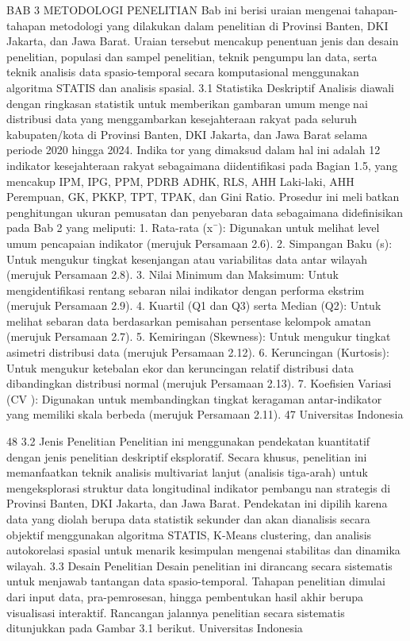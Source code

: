 BAB 3
METODOLOGI PENELITIAN
Bab ini berisi uraian mengenai tahapan-tahapan metodologi yang dilakukan dalam
penelitian di Provinsi Banten, DKI Jakarta, dan Jawa Barat. Uraian tersebut mencakup
penentuan jenis dan desain penelitian, populasi dan sampel penelitian, teknik pengumpulan data, serta teknik analisis data spasio-temporal secara komputasional menggunakan
algoritma STATIS dan analisis spasial.
3.1 Statistika Deskriptif
Analisis diawali dengan ringkasan statistik untuk memberikan gambaran umum mengenai distribusi data yang menggambarkan kesejahteraan rakyat pada seluruh kabupaten/kota
di Provinsi Banten, DKI Jakarta, dan Jawa Barat selama periode 2020 hingga 2024. Indikator yang dimaksud dalam hal ini adalah 12 indikator kesejahteraan rakyat sebagaimana
diidentifikasi pada Bagian 1.5, yang mencakup IPM, IPG, PPM, PDRB ADHK, RLS, AHH
Laki-laki, AHH Perempuan, GK, PKKP, TPT, TPAK, dan Gini Ratio. Prosedur ini melibatkan penghitungan ukuran pemusatan dan penyebaran data sebagaimana didefinisikan
pada Bab 2 yang meliputi:
1. Rata-rata (x¯): Digunakan untuk melihat level umum pencapaian indikator (merujuk
Persamaan 2.6).
2. Simpangan Baku (s): Untuk mengukur tingkat kesenjangan atau variabilitas data
antar wilayah (merujuk Persamaan 2.8).
3. Nilai Minimum dan Maksimum: Untuk mengidentifikasi rentang sebaran nilai
indikator dengan performa ekstrim (merujuk Persamaan 2.9).
4. Kuartil (Q1 dan Q3) serta Median (Q2): Untuk melihat sebaran data berdasarkan
pemisahan persentase kelompok amatan (merujuk Persamaan 2.7).
5. Kemiringan (Skewness): Untuk mengukur tingkat asimetri distribusi data (merujuk
Persamaan 2.12).
6. Keruncingan (Kurtosis): Untuk mengukur ketebalan ekor dan keruncingan relatif
distribusi data dibandingkan distribusi normal (merujuk Persamaan 2.13).
7. Koefisien Variasi (CV ): Digunakan untuk membandingkan tingkat keragaman
antar-indikator yang memiliki skala berbeda (merujuk Persamaan 2.11).
47 Universitas Indonesia

48
3.2 Jenis Penelitian
Penelitian ini menggunakan pendekatan kuantitatif dengan jenis penelitian deskriptifeksploratif. Secara khusus, penelitian ini memanfaatkan teknik analisis multivariat lanjut
(analisis tiga-arah) untuk mengeksplorasi struktur data longitudinal indikator pembangunan strategis di Provinsi Banten, DKI Jakarta, dan Jawa Barat. Pendekatan ini dipilih
karena data yang diolah berupa data statistik sekunder dan akan dianalisis secara objektif
menggunakan algoritma STATIS, K-Means clustering, dan analisis autokorelasi spasial
untuk menarik kesimpulan mengenai stabilitas dan dinamika wilayah.
3.3 Desain Penelitian
Desain penelitian ini dirancang secara sistematis untuk menjawab tantangan data
spasio-temporal. Tahapan penelitian dimulai dari input data, pra-pemrosesan, hingga
pembentukan hasil akhir berupa visualisasi interaktif. Rancangan jalannya penelitian
secara sistematis ditunjukkan pada Gambar 3.1 berikut.
Universitas Indonesia

